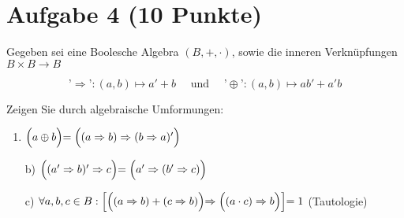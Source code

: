 \section*{Aufgabe 4 (10 Punkte)}

Gegeben sei eine Boolesche Algebra $(B, +, \cdot)$, sowie die inneren Verknüpfungen $B \times B \rightarrow B$

$$
\text{'}\Rightarrow\text{'}:  (a, b) \mapsto a' + b \quad \text{ und } \quad \text{'} \oplus \text{'}: (a,b) \mapsto ab' + a'b
$$

Zeigen Sie durch algebraische Umformungen:

\begin{enumerate}[label={a)}, leftmargin=*]
\item $\Bigl( a \oplus b \Bigl) = \Bigl((a \Rightarrow b) \Rightarrow (b \Rightarrow a)'\Bigl)$
\item[b)] $\Bigl((a' \Rightarrow b)' \Rightarrow c \Bigl) = \Bigl( a' \Rightarrow (b' \Rightarrow c)\Bigl)$
\item[c)] $\forall a, b, c \in B : \Bigl[ \Bigl( (a \Rightarrow b) + (c \Rightarrow b)\Bigl) \Rightarrow \Bigl( (a \cdot c) \Rightarrow b \Bigl) \Bigl] = 1$ (Tautologie)
\end{enumerate}
